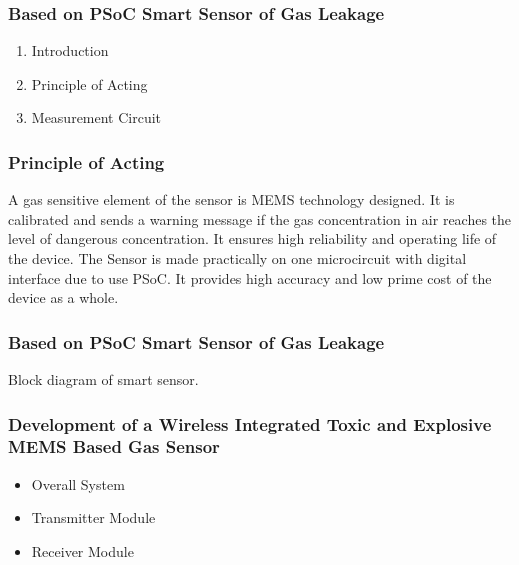 \documentclass{beamer}
\begin{document}
\begin{frame}
\frametitle{Based on PSoC Smart Sensor of Gas Leakage}
\begin{enumerate}
\item {Introduction}
\item {Principle of Acting}
\item {Measurement Circuit }
\end{enumerate}
\end{frame}

\begin{frame}
\frametitle{Principle of Acting}

A gas sensitive element of the sensor is MEMS technology designed.\newline
It is calibrated and sends a warning message if the gas concentration in air reaches the level of dangerous concentration.\newline
It ensures high reliability and operating life of the device. \newline
The Sensor is made practically on one microcircuit with digital interface due to use PSoC. \newline
It provides high accuracy and low prime cost of the device as a whole.
\end{frame}

\begin{frame}
\frametitle{Based on PSoC Smart Sensor of Gas Leakage}Block diagram of smart sensor.
\end{frame}

\begin{frame}
\frametitle{Development of a Wireless Integrated Toxic and Explosive MEMS Based Gas Sensor}
\begin{itemize}
\item {Overall System}
\item {Transmitter Module}
\item {Receiver Module }
\end{itemize}
\end{frame}
\end{document}
